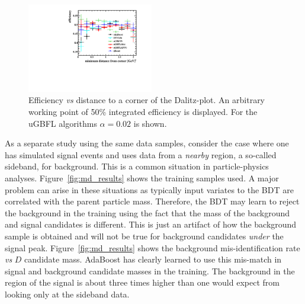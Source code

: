 \begin{figure}[] 
  \centering 
  \includegraphics[width=0.49\textwidth]{DP_compare.pdf}
  \caption{\label{fig:dalitz_results} Efficiency {\em vs} distance to a corner of the Dalitz-plot.  An arbitrary working point of 50\% integrated efficiency is displayed. For the uGBFL algorithms $\alpha=0.02$ is shown.}
\end{figure}


As a separate study using the same data samples, consider the case where one has simulated signal events and uses data from a {\em nearby} region, a so-called sideband, for background.  This is a common situation in particle-physics analyses.  Figure~\ref{fig:md_results} shows the training samples used.  A major problem can arise in these situations as typically input variates to the BDT are correlated with the parent particle mass.  Therefore, the BDT may learn to reject the background in the training using the fact that the mass of the background and signal candidates is different.  This is just an artifact of how the background sample is obtained and will not be true for background candidates {\em under} the signal peak.  Figure~\ref{fig:md_results} shows the background mis-identification rate {\em vs} $D$ candidate mass.  AdaBoost has clearly learned to use this mis-match in signal and background candidate masses in the training.   The background in the region of the signal is about three times higher than one would expect from looking only at the sideband data.  


